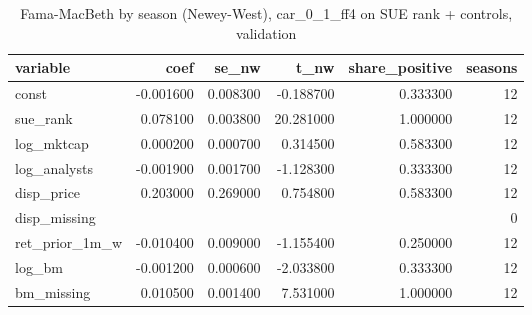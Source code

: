 \begin{table}
\caption{Fama-MacBeth by season (Newey-West), car_0_1_ff4 on SUE rank + controls, validation}
\label{tab:cd_surprise_fama_macbeth__validation}
\begin{tabular}{lrrrrr}
\toprule
variable & coef & se\_nw & t\_nw & share\_positive & seasons \\
\midrule
const & -0.001600 & 0.008300 & -0.188700 & 0.333300 & 12 \\
sue\_rank & 0.078100 & 0.003800 & 20.281000 & 1.000000 & 12 \\
log\_mktcap & 0.000200 & 0.000700 & 0.314500 & 0.583300 & 12 \\
log\_analysts & -0.001900 & 0.001700 & -1.128300 & 0.333300 & 12 \\
disp\_price & 0.203000 & 0.269000 & 0.754800 & 0.583300 & 12 \\
disp\_missing &  &  &  &  & 0 \\
ret\_prior\_1m\_w & -0.010400 & 0.009000 & -1.155400 & 0.250000 & 12 \\
log\_bm & -0.001200 & 0.000600 & -2.033800 & 0.333300 & 12 \\
bm\_missing & 0.010500 & 0.001400 & 7.531000 & 1.000000 & 12 \\
\bottomrule
\end{tabular}
\end{table}
